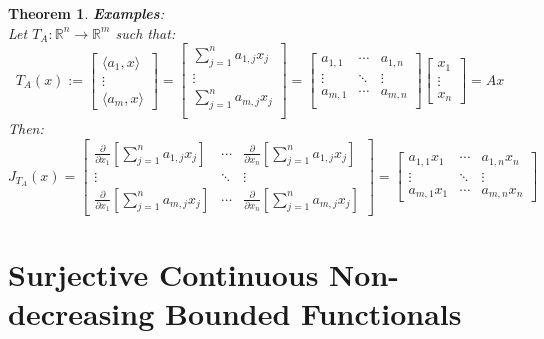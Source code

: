 \documentclass[12pt]{extarticle}
\theoremstyle{plain}
\newtheorem{thm}{Theorem}[section]
\theoremstyle{Definition}
\theoremstyle{Definition}
\theoremstyle{plain}
\begin{document}
\begin{thm} \textbf{Examples}: \\ 
	Let $T_A : \mathbb{R}^n \to \mathbb{R}^m$ such that:
	\[
	T_A(x) := 
	\begin{bmatrix}
	\langle a_1 , x \rangle \\
	\vdots \\
	\langle a_m , x \rangle
	\end{bmatrix}
	=
	\begin{bmatrix}
	\sum_{j=1}^{n} a_{1,j}x_j \\ 
	\vdots \\ 
	\sum_{j=1}^{n} a_{m,j}x_j \\ 	
	\end{bmatrix}
	= 
	\begin{bmatrix}
	a_{1,1} & \cdots & a_{1,n} \\ 
	\vdots & \ddots & \vdots \\ 
	a_{m,1} & \cdots & a_{m,n} \\ 	
	\end{bmatrix}
	\begin{bmatrix}
	x_1 \\ 
	\vdots \\ 
	x_n
	\end{bmatrix}
	= Ax
	\]
	Then: 
	\[
	J_{T_A}(x) = 
		\begin{bmatrix} 
		\frac{\partial }{\partial x_1}\left[\sum_{j=1}^{n} a_{1,j}x_j\right] & \cdots & \frac{\partial }{\partial x_n}\left[\sum_{j=1}^{n} a_{1,j}x_j\right] \\
		\vdots & \ddots & \vdots \\ 
		\frac{\partial }{\partial x_1}\left[\sum_{j=1}^{n} a_{m,j}x_j\right]& \cdots & \frac{\partial }{\partial x_n}\left[\sum_{j=1}^{n} a_{m,j}x_j\right] 
		\end{bmatrix}
		= 
		\begin{bmatrix} 
		 a_{1,1}x_1 & \cdots & a_{1,n}x_n \\
		\vdots & \ddots & \vdots \\ 
		a_{m,1}x_1 & \cdots & a_{m,n}x_n 
		\end{bmatrix}		
	\] 
\end{thm}

\newpage
\section{Surjective Continuous Non-decreasing Bounded Functionals}
\end{document}
